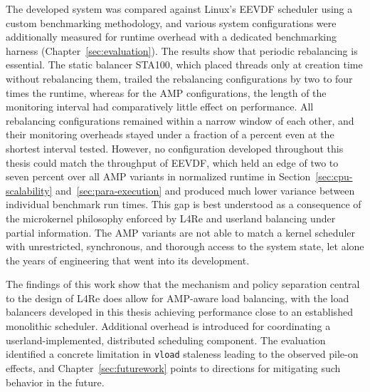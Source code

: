 The developed system was compared against Linux's EEVDF scheduler using a custom benchmarking methodology, and various system configurations were additionally measured for runtime overhead with a dedicated benchmarking harness (Chapter~\ref{sec:evaluation}).
The results show that periodic rebalancing is essential.
The static balancer STA100, which placed threads only at creation time without rebalancing them, trailed the rebalancing configurations by two to four times the runtime, whereas for the AMP configurations, the length of the monitoring interval had comparatively little effect on performance.
All rebalancing configurations remained within a narrow window of each other, and their monitoring overheads stayed under a fraction of a percent even at the shortest interval tested.
However, no configuration developed throughout this thesis could match the throughput of EEVDF, which held an edge of two to seven percent over all AMP variants in normalized runtime in Section~\ref{sec:cpu-scalability} and~\ref{sec:para-execution} and produced much lower variance between individual benchmark run times.
This gap is best understood as a consequence of the microkernel philosophy enforced by L4Re and userland balancing under partial information.
The AMP variants are not able to match a kernel scheduler with unrestricted, synchronous, and thorough access to the system state, let alone the years of engineering that went into its development.

The findings of this work show that the mechanism and policy separation central to the design of L4Re does allow for AMP-aware load balancing, with the load balancers developed in this thesis achieving performance close to an established monolithic scheduler.
Additional overhead is introduced for coordinating a userland-implemented, distributed scheduling component.
The evaluation identified a concrete limitation in \texttt{vload} staleness leading to the observed pile-on effects, and Chapter~\ref{sec:futurework} points to directions for mitigating such behavior in the future.

\cleardoublepage

